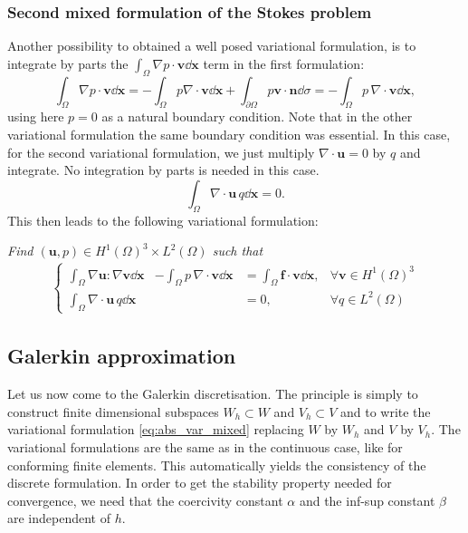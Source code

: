 \subsubsection*{Second mixed formulation of the Stokes problem}
Another possibility to obtained a well posed variational formulation, is to integrate by parts the
$ \int_{\Omega} \nabla p \cdot \mathbf{v} \dd \mathbf{x}$ term in the first formulation:
$$ \int_{\Omega} \nabla p \cdot \mathbf{v} \dd \mathbf{x} = - \int_{\Omega} p \nabla \cdot \mathbf{v} \dd \mathbf{x} 
+ \int_{\partial\Omega} p \mathbf{v} \cdot \mathbf{n}\dd \sigma=
 -\int_{\Omega} p \,\nabla \cdot \mathbf{v} \dd \mathbf{x} ,$$
 using here $p=0$ as a natural boundary condition. Note that in the other variational formulation the same boundary condition was essential. In this case, for the second variational formulation, we just multiply $\nabla\cdot \mathbf{u}=0$ by $q$ and integrate. No integration by parts is needed in this case.
$$\int_{\Omega} \nabla \cdot \mathbf{u}\, q \dd \mathbf{x} =0.$$
This then leads to the following variational formulation:
\begin{tcolorbox}
  {\em Find $( \mathbf{u},p)\in H^1(\Omega)^3\times L^2(\Omega)$ such that }
  \begin{align}
    \left\{
      \begin{array}{llll}
        \int_{\Omega}\nabla \mathbf{u}:\nabla \mathbf{v} \dd \mathbf{x} &- \int_{\Omega}  p \, \nabla\cdot \mathbf{v} \dd \mathbf{x}
        &= \int_{\Omega} \mathbf{f}\cdot \mathbf{v} \dd \mathbf{x}, &\forall \mathbf{v}\in H^1(\Omega)^3
        \\
        \int_{\Omega}  \nabla\cdot\mathbf{u}\, q\dd \mathbf{x} & &=0,  &\forall q\in L^2(\Omega)
      \end{array}
      \right.
  \label{eq:abs_var_mixed_stokes_2}
  \end{align}
\end{tcolorbox}


\subsection{Galerkin approximation}
Let us now come to the Galerkin discretisation. The principle is simply to construct finite dimensional subspaces $W_h \subset W$ and $V_h\subset V$ and to write the variational formulation \eqref{eq:abs_var_mixed} replacing $W$ by $W_h$ and $V$ by $V_h$. 
The variational formulations are the same as in the continuous case, like for conforming finite elements. This automatically yields the consistency of the discrete formulation.
In order to get the stability property needed for convergence, we need that the coercivity constant $\alpha$ and the inf-sup constant $\beta$ are independent of $h$.


